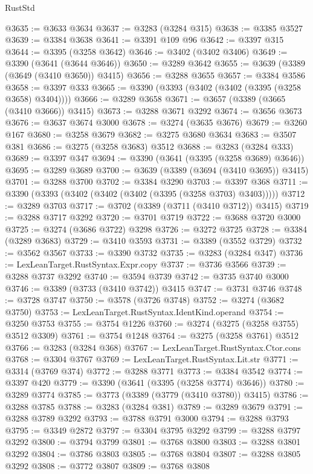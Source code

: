 \begin{lexlean}{RustStd}
\begin{coremodule}
@3635 := @3633 @3634
@3637 := @3283 (@3284 @315)
@3638 := @3385 @3527
@3639 := @3384 @3638
@3641 := @3391 @109 @96
@3642 := @3397 @315
@3644 := @3395 (@3258 @3642)
@3646 := @3402 (@3402 @3406)
@3649 := @3390 (@3641 (@3644 @3646))
@3650 := @3289 @3642
@3655 := @3639 (@3389 (@3649 (@3410 @3650)) @3415)
@3656 := @3288 @3655
@3657 := @3384 @3586
@3658 := @3397 @333
@3665 := @3390 (@3393 (@3402 (@3402 (@3395 (@3258 @3658) @3404))))
@3666 := @3289 @3658
@3671 := @3657 (@3389 (@3665 (@3410 @3666)) @3415)
@3673 := @3288 @3671 @3292
@3674 := @3656 @3673
@3676 := @3637 @3674 @3000
@3678 := @3274 (@3635 @3676)
@3679 := @3260 @167
@3680 := @3258 @3679
@3682 := @3275 @3680 @3634
@3683 := @3507 @381
@3686 := @3275 (@3258 @3683) @3512
@3688 := @3283 (@3284 @333)
@3689 := @3397 @347
@3694 := @3390 (@3641 (@3395 (@3258 @3689) @3646))
@3695 := @3289 @3689
@3700 := @3639 (@3389 (@3694 (@3410 @3695)) @3415)
@3701 := @3288 @3700
@3702 := @3384 @3290
@3703 := @3397 @368
@3711 := @3390 (@3393 (@3402 (@3402 (@3402 (@3395 (@3258 @3703) @3403)))))
@3712 := @3289 @3703
@3717 := @3702 (@3389 (@3711 (@3410 @3712)) @3415)
@3719 := @3288 @3717 @3292
@3720 := @3701 @3719
@3722 := @3688 @3720 @3000
@3725 := @3274 (@3686 @3722) @3298
@3726 := @3272 @3725
@3728 := @3384 (@3289 @3683)
@3729 := @3410 @3593
@3731 := @3389 (@3552 @3729)
@3732 := @3562 @3567
@3733 := @3390 @3732
@3735 := @3283 (@3284 @347)
@3736 := LexLeanTarget.RustSyntax.Expr.copy
@3737 := @3736 @3566
@3739 := @3288 @3737 @3292
@3740 := @3594 @3739
@3742 := @3735 @3740 @3000
@3746 := @3389 (@3733 (@3410 @3742)) @3415
@3747 := @3731 @3746
@3748 := @3728 @3747
@3750 := @3578 (@3726 @3748)
@3752 := @3274 (@3682 @3750)
@3753 := LexLeanTarget.RustSyntax.IdentKind.operand
@3754 := @3250 @3753
@3755 := @3754 @1226
@3760 := @3274 (@3275 (@3258 @3755) @3512 @3309)
@3761 := @3754 @1248
@3764 := @3275 (@3258 @3761) @3512
@3766 := @3283 (@3284 @368)
@3767 := LexLeanTarget.RustSyntax.Ctor.cons
@3768 := @3304 @3767
@3769 := LexLeanTarget.RustSyntax.Lit.str
@3771 := @3314 (@3769 @374)
@3772 := @3288 @3771
@3773 := @3384 @3542
@3774 := @3397 @420
@3779 := @3390 (@3641 (@3395 (@3258 @3774) @3646))
@3780 := @3289 @3774
@3785 := @3773 (@3389 (@3779 (@3410 @3780)) @3415)
@3786 := @3288 @3785
@3788 := @3283 (@3284 @381)
@3789 := @3289 @3679
@3791 := @3288 @3789 @3292
@3793 := @3788 @3791 @3000
@3794 := @3288 @3793
@3795 := @3349 @2872
@3797 := @3304 @3795 @3292
@3799 := @3288 @3797 @3292
@3800 := @3794 @3799
@3801 := @3768 @3800
@3803 := @3288 @3801 @3292
@3804 := @3786 @3803
@3805 := @3768 @3804
@3807 := @3288 @3805 @3292
@3808 := @3772 @3807
@3809 := @3768 @3808

\end{coremodule}
\end{lexlean}
